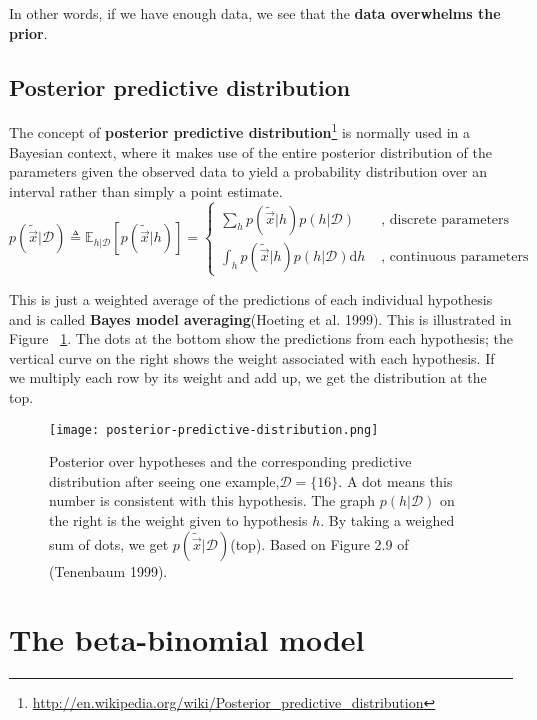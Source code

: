 In other words, if we have enough data, we see that the \textbf{data overwhelms the prior}.


\subsection{Posterior predictive distribution}
The concept of \textbf{posterior predictive distribution}\footnote{\url{http://en.wikipedia.org/wiki/Posterior_predictive_distribution}} is normally used in a Bayesian context, where it makes use of the entire posterior distribution of the parameters given the observed data to yield a probability distribution over an interval rather than simply a point estimate. 
\begin{equation}
p(\tilde{\vec{x}}|\mathcal{D}) \triangleq \mathbb{E}_{h|\mathcal{D}}[p(\tilde{\vec{x}}|h)] = \begin{cases}
\sum\limits_{h}p(\tilde{\vec{x}}|h)p(h|\mathcal{D}) &\text{ , discrete parameters}\\
\int_{h}p(\tilde{\vec{x}}|h)p(h|\mathcal{D})\mathrm{d}h &\text{ , continuous parameters}
\end{cases}
\end{equation}

This is just a weighted average of the predictions of each individual hypothesis and is called \textbf{Bayes model averaging}(Hoeting et al. 1999). This is illustrated in Figure ~\ref{fig:posterior-predictive-distribution}. The dots at the bottom show the predictions from each hypothesis; the vertical curve on the right shows the weight associated with each hypothesis. If we multiply each row by its weight and add up, we get the distribution at the top.

\begin{figure}[hbtp]
\centering
    \texttt{[image: posterior-predictive-distribution.png]}
\caption{Posterior over hypotheses and the corresponding predictive distribution after seeing one example,$\mathcal{D}=\{16\}$. A dot means this number is consistent with this hypothesis. The graph $p(h|\mathcal{D})$ on the right is the weight given to hypothesis $h$. By taking a weighed sum of dots, we get $p(\tilde{\vec{x}}|\mathcal{D})$(top). Based on Figure 2.9 of (Tenenbaum 1999).}
\label{fig:posterior-predictive-distribution} 
\end{figure}


\section{The beta-binomial model}


